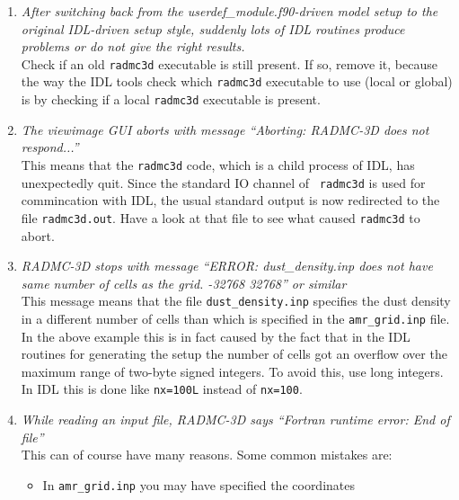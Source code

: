 \documentclass{report}
\begin{document}
\begin{enumerate}
  {\small\tt userdef\_module.f90}. If, however, in your own {\small\tt
    userdef\_module.f90} this subroutine is not yet built in, then the
  compiler can't find this subroutine and complains. Solution: just add a
  dummy subroutine to your {\small\tt userdef\_module.f90} with that name
  (have a look at the {\small\tt userdef\_module.f90} in the {\small\tt
    src/} directory).  Then recompile and it should now work.
\item {\em After switching back from the userdef\_module.f90-driven model
    setup to the original IDL-driven setup style, suddenly lots of IDL
    routines produce problems or do not give the right results.}\\
  Check if an old {\small\tt radmc3d} executable is still present. If so,
  remove it, because the way the IDL tools check which {\small\tt radmc3d}
  executable to use (local or global) is by checking if a local 
  {\small\tt radmc3d} executable is present.
\item {\em The viewimage GUI aborts with message ``Aborting: RADMC-3D does
    not respond...''}\\
  This means that the {\small\tt radmc3d} code, which is a child process of
  IDL, has unexpectedly quit. Since the standard IO channel of {\small\tt
    radmc3d} is used for commincation with IDL, the usual standard output
  is now redirected to the file {\small\tt radmc3d.out}. Have a look at that
  file to see what caused {\small\tt radmc3d} to abort.
\item {\em RADMC-3D stops with message ``ERROR: dust\_density.inp does not
    have same number of cells as the grid. -32768 32768'' or similar}\\
  This message means that the file {\small\tt dust\_density.inp} 
  specifies the dust density in a different number of cells than which is
  specified in the {\small\tt amr\_grid.inp} file. In the above example
  this is in fact caused by the fact that in the IDL routines for generating
  the setup the number of cells got an overflow over the maximum range of
  two-byte signed integers. To avoid this, use long integers. In IDL
  this is done like {\small\tt nx=100L} instead of {\small\tt nx=100}.
\item {\em While reading an input file, RADMC-3D says ``Fortran runtime error: End of file''}\\
  This can of course have many reasons. Some common mistakes are:
  \begin{itemize}
  \item In {\small\tt amr\_grid.inp} you may have specified the coordinates

\end{itemize}
\end{enumerate}
\end{document}
